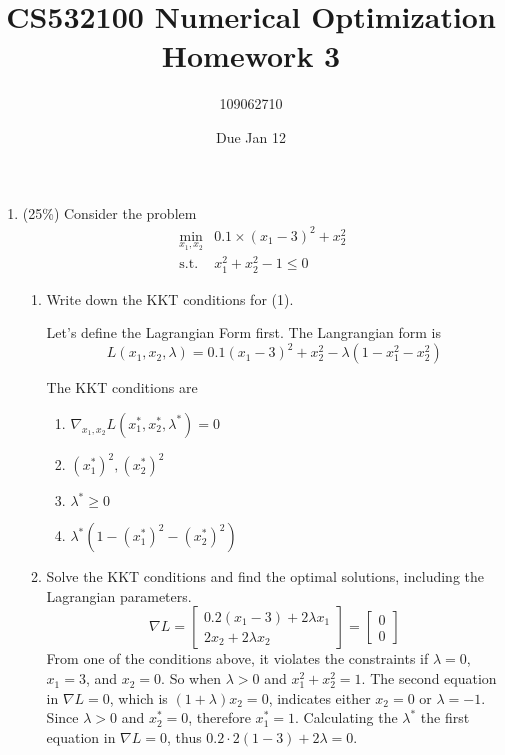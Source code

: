 \documentclass[a4paper,10pt]{article}
\title{CS532100 Numerical Optimization Homework 3}
\author{109062710}
\date{Due Jan 12}
\begin{document}
\maketitle
\begin{enumerate}
    \item (25\%)
    Consider the problem
    \begin{equation}\label{(1)}
        \begin{array}{cc}
            \displaystyle\min_{x_1,x_2} & 0.1\times(x_1-3)^2+x_2^2 \\
            \mbox{s.t.} & x_1^2+x_2^2 -1 \le 0
        \end{array}
    \end{equation}
    
    \begin{enumerate}
        \item Write down the KKT conditions for (1).

        {\color{blue}
            Let's define the Lagrangian Form first. The Langrangian form is
            \[
                L(x_1, x_2, \lambda) = 0.1(x_1 - 3)^2 + x_2^2 - \lambda (1 - x_1^2 - x_2^2)
            \]

            The KKT conditions are
            \begin{enumerate}
                \item $\nabla_{x_1, x_2} L(x_1^*, x_2^*, \lambda^*) = 0$
                \item $(x_1^*)^2, (x_2^*)^2$
                \item $\lambda^* \geq 0 $
                \item $\lambda^*(1 - (x_1^*)^2 - (x_2^*)^2)$
            \end{enumerate}
        }

        \item Solve the KKT conditions and find the optimal solutions, including the Lagrangian parameters.
        {\color{blue}
            \[ 
                \nabla L = \begin{bmatrix}0.2(x_1 - 3) + 2 \lambda x_1 \\ 2x_2 + 2 \lambda x_2\end{bmatrix} = \begin{bmatrix} 0 \\ 0 \end{bmatrix}
            \]
            From one of the conditions above, it violates the constraints if $\lambda = 0$, $x_1 = 3$, and $x_2 = 0$.
            So when $\lambda > 0$  and $x_1^2 + x_2^2 = 1$. 
            The second equation in $\nabla L = 0$, which is $(1+\lambda)x_2 = 0$, indicates either $x_2 = 0$ or $\lambda = -1$.
            Since $\lambda > 0$ and $x_2^* = 0$, therefore $x_1^* = 1$.
            Calculating the $\lambda^*$ the first equation in $\nabla L = 0$, thus $0.2 \cdot 2 (1-3) + 2 \lambda = 0$. 
        }


\end{enumerate}
\end{enumerate}
\end{document}
